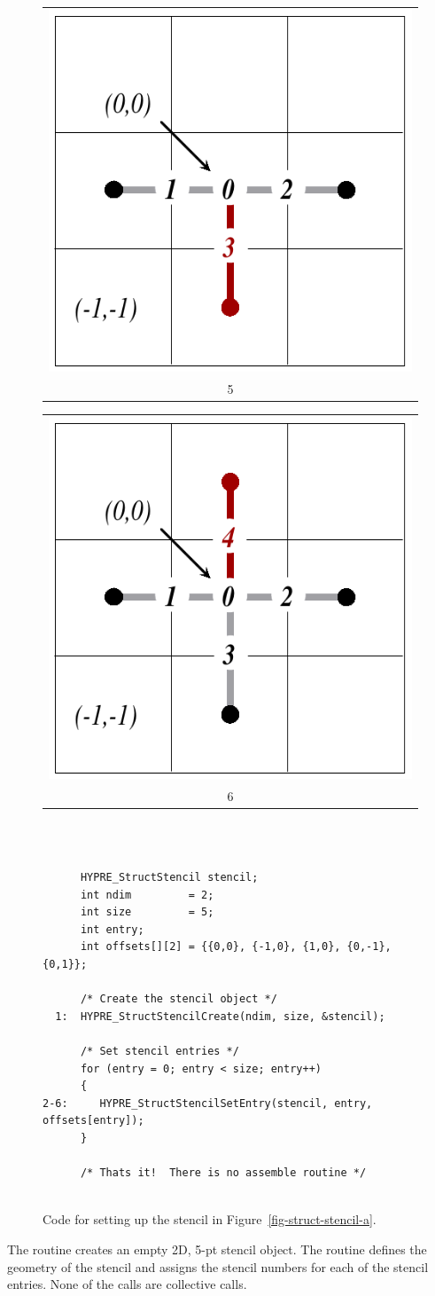 \begin{figure}
\begin{tabular}{@{}c@{}}
\includegraphics[width=.22\textwidth]{figStructStenc5} \\ 5
\end{tabular}
\hfill
\begin{tabular}{@{}c@{}}
\includegraphics[width=.22\textwidth]{figStructStenc6} \\ 6
\end{tabular}
\hfill\mbox{}
\vspace{2em} \\
\begin{minipage}{0.85\textwidth}
\begin{verbatim}
      
      HYPRE_StructStencil stencil;
      int ndim         = 2;
      int size         = 5;
      int entry;
      int offsets[][2] = {{0,0}, {-1,0}, {1,0}, {0,-1}, {0,1}};
      
      /* Create the stencil object */
  1:  HYPRE_StructStencilCreate(ndim, size, &stencil);
      
      /* Set stencil entries */
      for (entry = 0; entry < size; entry++)
      {
2-6:     HYPRE_StructStencilSetEntry(stencil, entry, offsets[entry]);
      }
      
      /* Thats it!  There is no assemble routine */
      
\end{verbatim}
\end{minipage}
\caption{%
Code for setting up the stencil in Figure~\ref{fig-struct-stencil-a}.}
\label{fig-struct-stencil-b}
\end{figure}
The  routine creates an empty 2D, 5-pt stencil object.  The
 routine defines the geometry of the stencil and assigns the
stencil numbers for each of the stencil entries.  None of the calls are
collective calls.


